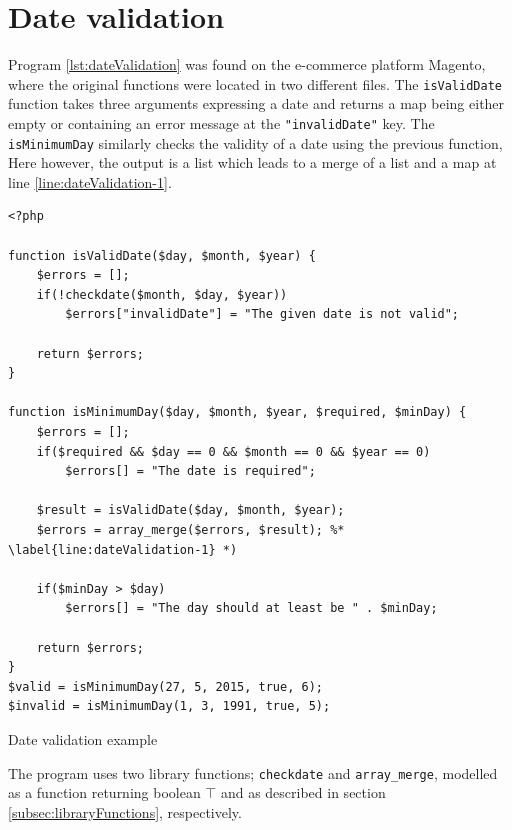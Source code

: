 \newpage
\section{Date validation}
Program \ref{lst:dateValidation} was found on the e-commerce platform Magento, where the original functions were located in two different files. The \texttt{isValidDate} function takes three arguments expressing a date and returns a map being either empty or containing an error message at the \texttt{"invalidDate"} key.  The \texttt{isMinimumDay} similarly checks the validity of a date using the previous function, Here however, the output is a list which leads to a merge of a list and a map at line \ref{line:dateValidation-1}. 

\begin{program}
\begin{lstlisting}
<?php

function isValidDate($day, $month, $year) {
    $errors = [];
    if(!checkdate($month, $day, $year))
        $errors["invalidDate"] = "The given date is not valid";

    return $errors;
}

function isMinimumDay($day, $month, $year, $required, $minDay) {
    $errors = [];
    if($required && $day == 0 && $month == 0 && $year == 0)
        $errors[] = "The date is required";

    $result = isValidDate($day, $month, $year);
    $errors = array_merge($errors, $result); %* \label{line:dateValidation-1} *)

    if($minDay > $day)
        $errors[] = "The day should at least be " . $minDay;

    return $errors;
}
$valid = isMinimumDay(27, 5, 2015, true, 6);
$invalid = isMinimumDay(1, 3, 1991, true, 5);
\end{lstlisting}
\caption{Date validation example}
\label{lst:dateValidation}
\end{program}

The program uses two library functions; \texttt{checkdate} and \texttt{array\_merge}, modelled as a function returning boolean $\top$ and as described in section \ref{subsec:libraryFunctions}, respectively.





